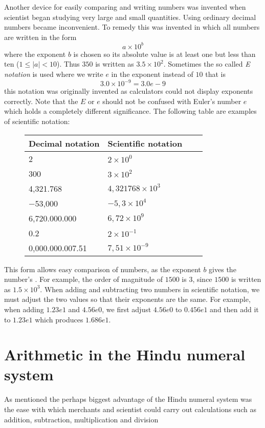 Another device for easily comparing and writing numbers was invented when scientist began studying very large and small quantities. Using ordinary decimal numbers became inconvenient. To remedy this  was invented in which all numbers are written in the form
\[
a \times 10^b
\]
where the exponent $b$ is chosen so its absolute value is at least one but less than ten ($1 \leq |a| < 10$). Thus $350$ is written as $3.5×10^2$. Sometimes the so called \textit{E notation} is used where we write $e$ in the exponent instead of $10$ that is
\[
3.0 \times 10^{-9} = 3.0e−9
\]
this notation was originally invented as calculators could not display exponents correctly. Note that the $E$ or $e$ should not be confused with Euler's number $e$ which holds a completely different significance. The following table are examples of scientific notation:
\begin{figure}[H]
\centering
\begin{tabular}{|l|l|l|l|}
\hline
\textbf{Decimal notation}   & \textbf{Scientific notation} \\ \hline
2                           & $2 \times 10^0$              \\ \hline
300                         & $3 \times 10^2$              \\ \hline
4,321.768                   & $4,321768 \times 10^3$       \\ \hline
−53,000                     & $−5,3 \times 10^4$           \\ \hline
6,720.000.000	           & $6,72 \times 10^9$           \\ \hline
0.2	                        & $2 \times 10^{−1}$           \\ \hline
0,000.000.007.51	           & $7,51 \times 10^{−9}$        \\ \hline
\end{tabular}
\end{figure}
This form allows easy comparison of numbers, as the exponent $b$ gives the number's . For example, the order of magnitude of $1500$ is $3$, since $1500$ is written as $1.5 × 10^3$. When adding and subtracting two numbers in scientific notation, we must adjust the two values so that their exponents are the same. For example, when adding $1.23e1$ and $4.56e0$, we first adjust $4.56e0$ to $0.456e1$ and then add it to $1.23e1$ which produces $1.686e1$.

\section{Arithmetic in the Hindu numeral system}
As mentioned the perhaps biggest advantage of the Hindu numeral system was the ease with which merchants and scientist could carry out calculations such as addition, subtraction, multiplication and division

